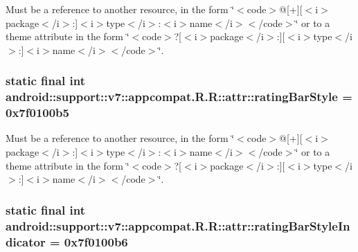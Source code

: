 Must be a reference to another resource, in the form \char`\"{}$<$code$>$@\mbox{[}+\mbox{]}\mbox{[}$<$i$>$package$<$/i$>$:\mbox{]}$<$i$>$type$<$/i$>$:$<$i$>$name$<$/i$>$$<$/code$>$\char`\"{} or to a theme attribute in the form \char`\"{}$<$code$>$?\mbox{[}$<$i$>$package$<$/i$>$:\mbox{]}\mbox{[}$<$i$>$type$<$/i$>$:\mbox{]}$<$i$>$name$<$/i$>$$<$/code$>$\char`\"{}. \hypertarget{classandroid_1_1support_1_1v7_1_1appcompat_1_1_r_1_1attr_8f380cbb7f486eb6af57d87d9a0e6ee8}{
\subsubsection[{ratingBarStyle}]{\setlength{\rightskip}{0pt plus 5cm}static final int android::support::v7::appcompat.R.R::attr::ratingBarStyle = 0x7f0100b5}}
\label{classandroid_1_1support_1_1v7_1_1appcompat_1_1_r_1_1attr_8f380cbb7f486eb6af57d87d9a0e6ee8}


Must be a reference to another resource, in the form \char`\"{}$<$code$>$@\mbox{[}+\mbox{]}\mbox{[}$<$i$>$package$<$/i$>$:\mbox{]}$<$i$>$type$<$/i$>$:$<$i$>$name$<$/i$>$$<$/code$>$\char`\"{} or to a theme attribute in the form \char`\"{}$<$code$>$?\mbox{[}$<$i$>$package$<$/i$>$:\mbox{]}\mbox{[}$<$i$>$type$<$/i$>$:\mbox{]}$<$i$>$name$<$/i$>$$<$/code$>$\char`\"{}. \hypertarget{classandroid_1_1support_1_1v7_1_1appcompat_1_1_r_1_1attr_e43e403eacf87c13aaab9dff5a36d1ac}{
\subsubsection[{ratingBarStyleIndicator}]{\setlength{\rightskip}{0pt plus 5cm}static final int android::support::v7::appcompat.R.R::attr::ratingBarStyleIndicator = 0x7f0100b6}}
\label{classandroid_1_1support_1_1v7_1_1appcompat_1_1_r_1_1attr_e43e403eacf87c13aaab9dff5a36d1ac}


